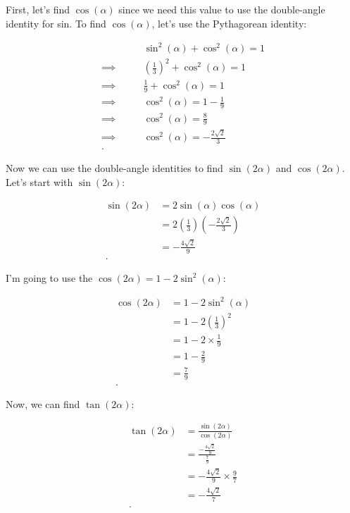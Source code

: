 \begin{solution}
  \label{sol:sin_alpha_1_over_3_in_quadrant_2}

  First, let's find $\cos (\alpha)$ since we need this value to use the
  double-angle identity for sin. To find $\cos (\alpha)$, let's use the
  Pythagorean identity:

  \begin{align*}
    \qquad&\sin^{2} (\alpha) + \cos^{2} (\alpha) = 1 \\
    \implies\qquad&\left(\frac{1}{3}\right)^{2} + \cos^{2} (\alpha) = 1 \\
    \implies\qquad&\frac{1}{9} + \cos^{2} (\alpha) = 1 \\
    \implies\qquad&\cos^{2} (\alpha) = 1 - \frac{1}{9} \\
    \implies\qquad&\cos^{2} (\alpha) = \frac{8}{9} \\
    \implies\qquad&\cos^{2} (\alpha) = -\frac{2\sqrt{2}}{3} \\
  .\end{align*}

  Now we can use the double-angle identities to find $\sin (2\alpha)$ and $\cos
  (2\alpha)$. Let's start with $\sin (2\alpha)$:

  \begin{align*}
    \sin (2\alpha) &= 2\sin (\alpha)\cos (\alpha) \\
                   &= 2\left(\frac{1}{3}\right)\left(-\frac{2\sqrt{2}}{3}\right) \\
                   &= -\frac{4\sqrt{2}}{9} \\
  .\end{align*}

  I'm going to use the $\cos (2\alpha) = 1 - 2\sin^{2} (\alpha)$:

  \begin{align*}
    \cos (2\alpha) &= 1 - 2\sin^{2} (\alpha) \\
                   &= 1 - 2\left(\frac{1}{3}\right)^{2} \\
                   &= 1 - 2 \times \frac{1}{9} \\
                   &= 1 - \frac{2}{9} \\
                   &= \frac{7}{9} \\
  .\end{align*}

  Now, we can find $\tan (2\alpha)$:

  \begin{align*}
    \tan (2\alpha) &= \frac{\sin (2\alpha)}{\cos (2\alpha)} \\
                   &= \frac{-\frac{4\sqrt{2}}{9}}{\frac{7}{9}} \\
                   &= -\frac{4\sqrt{2}}{9} \times \frac{9}{7} \\
                   &= -\frac{4\sqrt{2}}{7} \\
  .\end{align*}
\end{solution}
